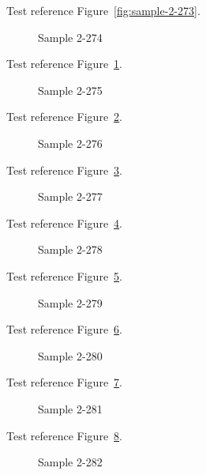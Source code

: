 Test reference Figure~\ref{fig:sample-2-273}.

\begin{figure}[tbhp]
\caption{Sample 2-274}
\label{fig:sample-2-274}
\end{figure}

Test reference Figure~\ref{fig:sample-2-274}.

\begin{figure}[tbhp]
\caption{Sample 2-275}
\label{fig:sample-2-275}
\end{figure}

Test reference Figure~\ref{fig:sample-2-275}.

\begin{figure}[tbhp]
\caption{Sample 2-276}
\label{fig:sample-2-276}
\end{figure}

Test reference Figure~\ref{fig:sample-2-276}.

\begin{figure}[tbhp]
\caption{Sample 2-277}
\label{fig:sample-2-277}
\end{figure}

Test reference Figure~\ref{fig:sample-2-277}.

\begin{figure}[tbhp]
\caption{Sample 2-278}
\label{fig:sample-2-278}
\end{figure}

Test reference Figure~\ref{fig:sample-2-278}.

\begin{figure}[tbhp]
\caption{Sample 2-279}
\label{fig:sample-2-279}
\end{figure}

Test reference Figure~\ref{fig:sample-2-279}.

\begin{figure}[tbhp]
\caption{Sample 2-280}
\label{fig:sample-2-280}
\end{figure}

Test reference Figure~\ref{fig:sample-2-280}.

\begin{figure}[tbhp]
\caption{Sample 2-281}
\label{fig:sample-2-281}
\end{figure}

Test reference Figure~\ref{fig:sample-2-281}.

\begin{figure}[tbhp]
\caption{Sample 2-282}
\label{fig:sample-2-282}
\end{figure}

